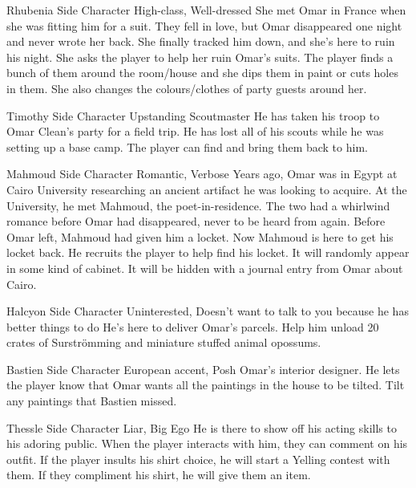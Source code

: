 {Rhubenia}
{Side Character}
{High-class, Well-dressed}
{She met Omar in France when she was fitting him for a suit. They fell in love, but Omar disappeared one night and never wrote her back. She finally tracked him down, and she's here to ruin his night.}
{She asks the player to help her ruin Omar's suits. The player finds a bunch of them around the room/house and she dips them in paint or cuts holes in them. She also changes the colours/clothes of party guests around her.}

{Timothy}
{Side Character}
{Upstanding Scoutmaster}
{He has taken his troop to Omar Clean's party for a field trip.}
{He has lost all of his scouts while he was setting up a base camp. The player can find and bring them back to him.}

{Mahmoud}
{Side Character}
{Romantic, Verbose}
{Years ago, Omar was in Egypt at Cairo University researching an ancient artifact he was looking to acquire. At the University, he met Mahmoud, the poet-in-residence. The two had a whirlwind romance before Omar had disappeared, never to be heard from again. Before Omar left, Mahmoud had given him a locket. Now Mahmoud is here to get his locket back.}
{He recruits the player to help find his locket. It will randomly appear in some kind of cabinet. It will be hidden with a journal entry from Omar about Cairo.}

{Halcyon}
{Side Character}
{Uninterested, Doesn't want to talk to you because he has better things to do}
{He's here to deliver Omar's parcels.}
{Help him unload 20 crates of Surstr\"{o}mming and miniature stuffed animal opossums.}

{Bastien}
{Side Character}
{European accent, Posh}
{Omar's interior designer.}
{He lets the player know that Omar wants all the paintings in the house to be tilted. Tilt any paintings that Bastien missed.}

{Thessle}
{Side Character}
{Liar, Big Ego}
{He is there to show off his acting skills to his adoring public.}
{When the player interacts with him, they can comment on his outfit. If the player insults his shirt choice, he will start a Yelling contest with them. If they compliment his shirt, he will give them an item.}